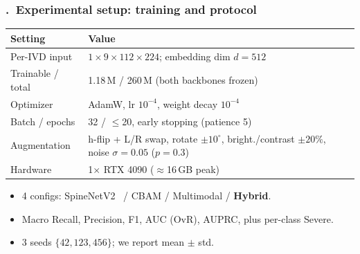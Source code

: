 \documentclass[12pt]{beamer}
\newcommand{\sframetitle}[1]{\frametitle{\thesection.\ #1}}
\begin{document}
\begin{frame}
\sframetitle{Experimental setup: training and protocol}
\begin{table}
\centering
\footnotesize
\renewcommand{\arraystretch}{1.15}
\begin{tabular}{@{}l p{6.1cm}@{}}
\toprule
\textbf{Setting} & \textbf{Value} \\
\midrule
Per-IVD input & $1\times9\times112\times224$; embedding dim $d=512$ \\
Trainable / total & 1.18\,M / 260\,M (both backbones frozen) \\
Optimizer & AdamW, lr $10^{-4}$, weight decay $10^{-4}$ \\
Batch / epochs & 32 / $\leq$20, early stopping (patience 5) \\
Augmentation & h-flip + L/R swap, rotate $\pm10^{\circ}$, bright./contrast $\pm20\%$, noise $\sigma{=}0.05$ ($p{=}0.3$) \\
Hardware & 1$\times$ RTX 4090 ($\approx$16\,GB peak) \\
\bottomrule
\end{tabular}
\end{table}
\vspace{2pt}
\begin{itemize}
    \item[--] 4 configs: SpineNetV2~\cite{windsor2022} / CBAM / Multimodal / \textbf{Hybrid}.
    \item[--] Macro Recall, Precision, F1, AUC (OvR), AUPRC, plus per-class Severe.
    \item[--] 3 seeds $\{42, 123, 456\}$; we report mean $\pm$ std.
\end{itemize}
\end{frame}
\end{document}
